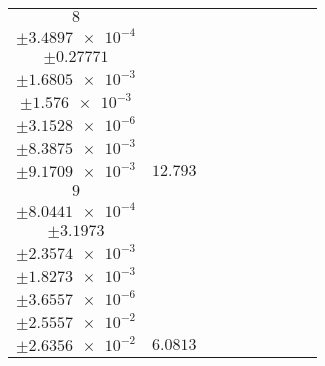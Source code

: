 \documentclass[8pt]{article}
\begin{document}
\begin{longtable}[l]{c c c c c c c c c}
$\num{8}$ & \begin{tabular}[c]{@{}c@{}}$\num{7.748e-2}$ \\ $\pm\num{3.4897e-4}$\end{tabular} & \begin{tabular}[c]{@{}c@{}}$\num{-0.11635}$ \\ $\pm\num{0.27771}$\end{tabular} & \begin{tabular}[c]{@{}c@{}}$\num{-4.3056}$ \\ $\pm\num{1.6805e-3}$\end{tabular} & \begin{tabular}[c]{@{}c@{}}$\num{3.5786e+3}$ \\ $\pm\num{1.576e-3}$\end{tabular} & \begin{tabular}[c]{@{}c@{}}$\num{7.1593}$ \\ $\pm\num{3.1528e-6}$\end{tabular} & \begin{tabular}[c]{@{}c@{}}$\num{1.5316}$ \\ $\pm\num{8.3875e-3}$\end{tabular} & \begin{tabular}[c]{@{}c@{}}$\num{1.4108}$ \\ $\pm\num{9.1709e-3}$\end{tabular} & $\num{12.793}$\\
$\num{9}$ & \begin{tabular}[c]{@{}c@{}}$\num{3.6385e-2}$ \\ $\pm\num{8.0441e-4}$\end{tabular} & \begin{tabular}[c]{@{}c@{}}$\num{1.79}$ \\ $\pm\num{3.1973}$\end{tabular} & \begin{tabular}[c]{@{}c@{}}$\num{-3.2707}$ \\ $\pm\num{2.3574e-3}$\end{tabular} & \begin{tabular}[c]{@{}c@{}}$\num{3.5797e+3}$ \\ $\pm\num{1.8273e-3}$\end{tabular} & \begin{tabular}[c]{@{}c@{}}$\num{7.1613}$ \\ $\pm\num{3.6557e-6}$\end{tabular} & \begin{tabular}[c]{@{}c@{}}$\num{0.59753}$ \\ $\pm\num{2.5557e-2}$\end{tabular} & \begin{tabular}[c]{@{}c@{}}$\num{0.64863}$ \\ $\pm\num{2.6356e-2}$\end{tabular} & $\num{6.0813}$\\

\end{longtable}
\end{document}
